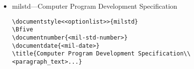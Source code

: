 \begin{itemize}
\begin{small}
\begin{verbatim}
\subsubsection{Responsibility for test.}

\subsubsection{Special tests and examinations.}

\subsection{Quality conformance inspections.}

\section{PREPARATION FOR DELIVERY}

\section{NOTES}

\appendix
%
% \section will now generate appendices starting with section 10, 20, etc.
%
\section{<text>} % Section 10, Appendix I

\section{<text>} % Section 20, Appendix II


\end{verbatim}
\end{small}

\item milstd---Computer Program Development Specification

\begin{small}
\begin{verbatim}
\documentstyle<<optionlist>>{milstd}
\Bfive
\documentnumber{<mil-std-number>}
\documentdate{<mil-date>}
\title{Computer Program Development Specification\\
<paragraph_text>...}




\end{verbatim}
\end{small}
\end{itemize}
